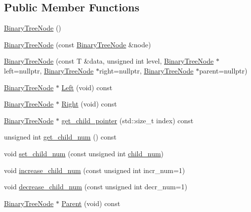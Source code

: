 \subsection*{Public Member Functions}
\textbf{ }\par
\begin{DoxyCompactItemize}
\item 
\hyperlink{classBinaryTreeNode_aa7a20e203a1e6aa2cf59be86bd493f08}{Binary\+Tree\+Node} ()
\item 
\hyperlink{classBinaryTreeNode_a44089b64b058a805e5f17d9518317f38}{Binary\+Tree\+Node} (const \hyperlink{classBinaryTreeNode}{Binary\+Tree\+Node} \&node)
\item 
\hyperlink{classBinaryTreeNode_adc784168efc0f866e0c5eb368cfec60e}{Binary\+Tree\+Node} (const T \&data, unsigned int level, \hyperlink{classBinaryTreeNode}{Binary\+Tree\+Node} $\ast$left=nullptr, \hyperlink{classBinaryTreeNode}{Binary\+Tree\+Node} $\ast$right=nullptr, \hyperlink{classBinaryTreeNode}{Binary\+Tree\+Node} $\ast$parent=nullptr)
\item 
\hyperlink{classBinaryTreeNode}{Binary\+Tree\+Node} $\ast$ \hyperlink{classBinaryTreeNode_af72f5be84f4ac9fa158718032cada52a}{Left} (void) const
\item 
\hyperlink{classBinaryTreeNode}{Binary\+Tree\+Node} $\ast$ \hyperlink{classBinaryTreeNode_ade872fc08f12c154c28c934a3991ae08}{Right} (void) const
\item 
\hyperlink{classBinaryTreeNode}{Binary\+Tree\+Node} $\ast$ \hyperlink{classBinaryTreeNode_a2ef0648ec3a937f4153a877b0e47eaa5}{get\+\_\+child\+\_\+pointer} (std\+::size\+\_\+t index) const
\item 
unsigned int \hyperlink{classBinaryTreeNode_a41d03ea4bdbb686094273fa47c7f988a}{get\+\_\+child\+\_\+num} () const
\item 
void \hyperlink{classBinaryTreeNode_ae9c5a478fed2c72e7aa9f2b28a0010e7}{set\+\_\+child\+\_\+num} (const unsigned int \hyperlink{classBinaryTreeNode_a434bfe00afd0b3dc86943e138f49fc3d}{child\+\_\+num})
\item 
void \hyperlink{classBinaryTreeNode_a0c22f12230f685c522ab80484ce4ce7f}{increase\+\_\+child\+\_\+num} (const unsigned int incr\+\_\+num=1)
\item 
void \hyperlink{classBinaryTreeNode_a05dfef5724e65a69494ac91d40852bde}{decrease\+\_\+child\+\_\+num} (const unsigned int decr\+\_\+num=1)
\item 
\hyperlink{classBinaryTreeNode}{Binary\+Tree\+Node} $\ast$ \hyperlink{classBinaryTreeNode_a2eea9d71ae776d02b23bb9f3869f0f6d}{Parent} (void) const

\end{DoxyCompactItemize}
